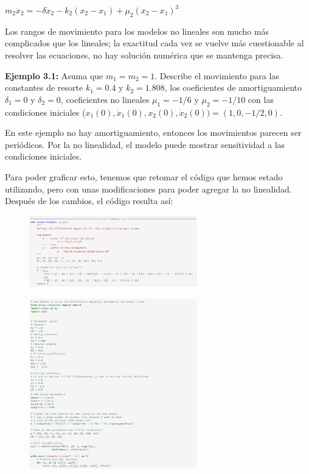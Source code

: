 \documentclass[a4paper]{article}
\begin{document}
\begin{center}
\begin{center}
$m_2 \ddot x_2 = - \delta\dot x_2 - k_2(x_2 - x_1) + \mu_2(x_2 - x_1)^3$
\end{center}

Los rangos de movimiento para los modelos no lineales son mucho más complicados que los lineales; la exactitud cada vez se vuelve más cuestionable al resolver las ecuaciones, no hay solución numérica que se mantenga precisa.

\smallskip
\textbf{Ejemplo 3.1:} Asuma que $m_1 = m_2 = 1$. Describe el movimiento para las constantes de resorte $k_1 = 0.4$ y $k_2 = 1.808$, los coeficientes de amortiguamiento $\delta_1 = 0$ y $\delta_2 = 0$, coeficientes no lineales $\mu_1 = -1/6$ y $\mu_2 = -1/10$ con las condiciones iniciales ($x_1(0), \dot x_1(0), x_2(0), \dot x_2(0)) = (1,0,-1/2,0)$.

En este ejemplo no hay amortiguamiento, entonces los movimientos parecen ser periódicos. Por la no linealidad, el modelo puede mostrar sensitividad a las condiciones iniciales.
\smallskip

Para poder graficar esto, tenemos que retomar el código que hemos estado utilizando, pero con unas modificaciones para poder agregar la no linealidad. Después de los cambios, el código resulta así:
\begin{figure}[ht!]
 \centering
  \includegraphics[width=0.65\textwidth]{Codigo4.PNG}
\end{figure}
\begin{figure}[ht!]
 \centering
  \includegraphics[width=0.65\textwidth]{Codigo5.png}
\end{figure}


\end{center}
\end{document}

